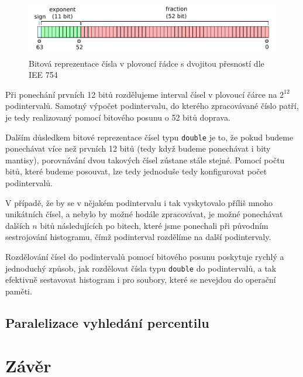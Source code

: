\documentclass[12pt, a4paper]{article}
\let\oldsection\section
\renewcommand\section{\clearpage\oldsection}
\begin{document}
\begin{figure}[!ht]
    \centering 
    \includegraphics[width=1\textwidth]{pdf/double.pdf}
    \caption{Bitová reprezentace čísla v plovoucí řádce s dvojitou přesností dle IEE 754}
\end{figure}

Při ponechání prvních 12 bitů rozdělujeme interval čísel v plovoucí čárce na $2^{12}$ podintervalů.
Samotný výpočet podintervalu, do kterého zpracovávané číslo patří, je tedy realizovaný pomocí bitového posunu o 52 bitů doprava.

Dalším důsledkem bitové reprezentace čísel typu \texttt{double} je to, že pokud budeme ponechávat více než prvních 12 bitů (tedy když budeme ponechávat i bity mantisy), porovnávání dvou takových čísel zústane stále stejné.
Pomocí počtu bitů, které budeme posouvat, lze tedy jednoduše tedy konfigurovat počet podintervalů.

V případě, že by se v nějakém podintervalu i tak vyskytovalo příliš mnoho unikátních čísel, a nebylo by možné hodále zpracovávat, je možné ponechávat dalších $n$ bitů následujících po bitech, které jsme ponechali při původním sestrojování histogramu, čímž podinterval rozdělíme na další podintervaly.

Rozdělování čísel do podintervalů pomocí bitového posunu poskytuje rychlý a jednoduchý způsob, jak rozdělovat čísla typu \texttt{double} do podintervalů, a tak efektivně sestavovat histogram i pro soubory, které se nevejdou do operační paměti.

\subsection{Paralelizace vyhledání percentilu}



\section{Závěr}
\end{document}
